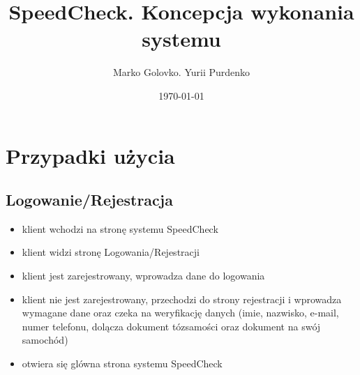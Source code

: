 \documentclass[12pt]{article}
\title{SpeedCheck. Koncepcja wykonania systemu}
\author{Marko Golovko. Yurii Purdenko}
\date{\today}
\begin{document}
\begin{titlepage}
\maketitle
\end{titlepage}

\renewcommand{\vhhistoryname}{Historia zmian}
\newcommand{\MG}{Marko Golovko}
\begin{versionhistory}
  \renewcommand{\vhhistoryname}{Histria zmian}
  \renewcommand{\vhversionname}{Numer wersji}  
  \renewcommand{\vhdatename}{Data} 
  \renewcommand{\vhauthorname}{Autor} 
  \renewcommand{\vhchangename}{Opis}
\end{versionhistory}

\tableofcontents

\section{Przypadki użycia}
	
	\subsection{Logowanie/Rejestracja}
	\begin{itemize}
	\item klient wchodzi na stronę systemu SpeedCheck
	\item klient widzi stronę Logowania/Rejestracji
	\item klient jest zarejestrowany, wprowadza dane do logowania
	\item klient nie jest zarejestrowany, przechodzi do strony rejestracji i wprowadza wymagane dane oraz czeka na weryfikację danych (imie, nazwisko, e-mail, numer telefonu, dolącza dokument tózsamości oraz dokument na swój samochód)
	\item otwiera się glówna strona systemu SpeedCheck 
	\end{itemize}
	
\end{document}
